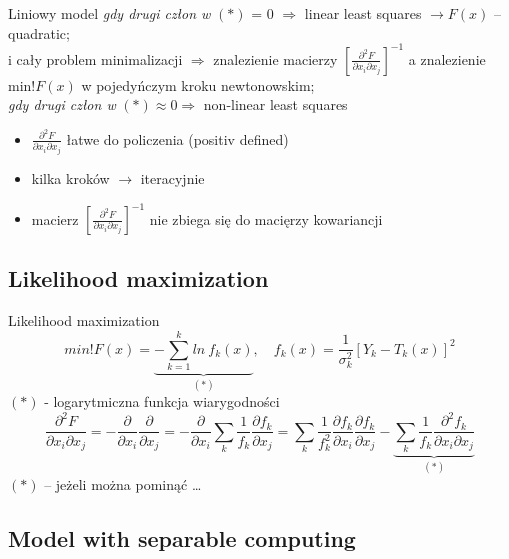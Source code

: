   \begin{frame}{Liniowy model}
    \emph{gdy drugi człon w} $(*)$ = 0 $\Rightarrow$
    linear least squares $\to F(x)$ -- quadratic; \\
    i cały problem minimalizacji $\Rightarrow$ znalezienie
    macierzy $\left[ \frac{\partial^2 F}{\partial x_{i} \partial x_{j}} \right]^{-1}$
    a znalezienie min!$F(x)$ w pojedyńczym kroku newtonowskim;\\
    \emph{gdy drugi człon w} $(*) \approx 0 \Rightarrow$
    non-linear least squares\\
    \begin{itemize}
      \item $\frac{\partial^2 F}{\partial x_{i} \partial x_{j}}$
      łatwe do policzenia (positiv defined)
      \item kilka kroków $\to$ iteracyjnie
      \item macierz $\left[ \frac{\partial^2 F}{\partial x_{i} \partial x_{j}} \right]^{-1}$
      nie zbiega się do macięrzy kowariancji
    \end{itemize}
  \end{frame}

\subsection{Likelihood maximization}
  \begin{frame}{Likelihood maximization}
    \begin{equation}
      min!F(x) = \underbrace{- \sum_{k=1}^{k} ln\ f_{k}(x)}_{(*)}{,} \quad
      f_{k}(x) = \frac{1}{\sigma^{2}_{k}} \left[ Y_{k} - T_{k}(x) \right]^2
      \nonumber
    \end{equation}
    $(*)$ - logarytmiczna funkcja wiarygodności
    \begin{equation}
      \frac{\partial^2 F}{\partial x_{i} \partial x_{j}} =
      - \frac{\partial}{\partial x_{i}}\frac{\partial}{\partial x_{j}} =
      - \frac{\partial}{\partial x_{i}}
      \sum_{k} \frac{1}{f_{k}} \frac{\partial f_{k}}{\partial x_{j}} =
      \sum_{k} \frac{1}{f^{2}_{k}} \frac{\partial f_{k}}{\partial x_{i}} \frac{\partial f_{k}}{\partial x_{j}} -
      \underbrace{\sum_{k} \frac{1}{f_{k}} \frac{\partial^{2} f_{k}}{\partial x_{i} \partial x_{j}}}_{(*)}
      \nonumber
    \end{equation}
    $(*)$ -- jeżeli można pominąć \dots
  \end{frame}

\subsection{Model with separable computing}

